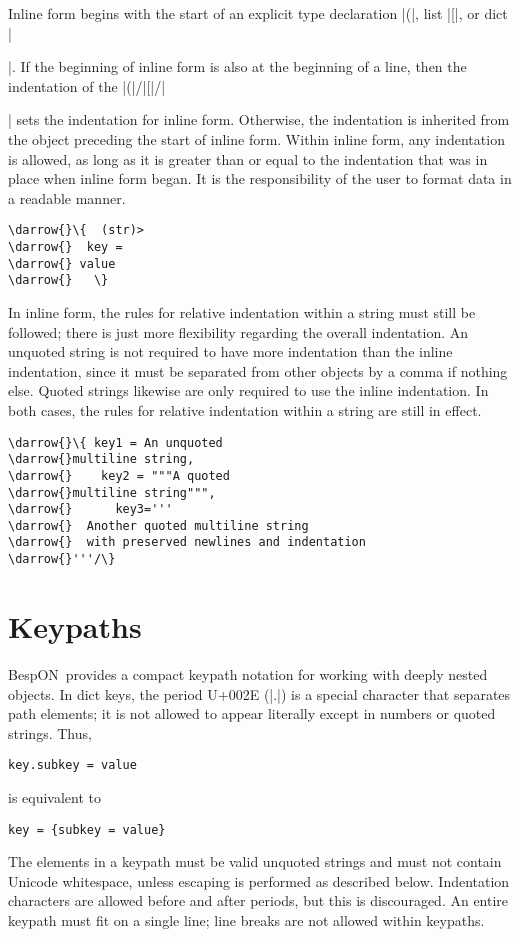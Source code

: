 \documentclass[11pt]{article}
\newcommand{\bespon}{BespON}
\newcommand{\darrow}{\ensuremath{\textcolor{DarkGreen}{\downarrow}}}
\begin{document}
Inline form begins with the start of an explicit type declaration |(|, list |[|, or dict |{|.  If the beginning of inline form is also at the beginning of a line, then the indentation of the |(|/|[|/|{| sets the indentation for inline form.  Otherwise, the indentation is inherited from the object preceding the start of inline form.  Within inline form, any indentation is allowed, as long as it is greater than or equal to the indentation that was in place when inline form began.  It is the responsibility of the user to format data in a readable manner.
\begin{Verbatim}[commandchars=\\\{\}]
\darrow{}\{  (str)>
\darrow{}  key = 
\darrow{} value
\darrow{}   \}
\end{Verbatim}

In inline form, the rules for relative indentation within a string must still be followed; there is just more flexibility regarding the overall indentation.  An unquoted string is not required to have more indentation than the inline indentation, since it must be separated from other objects by a comma if nothing else.  Quoted strings likewise are only required to use the inline indentation.  In both cases, the rules for relative indentation within a string are still in effect.
\begin{Verbatim}[commandchars=\\\{\}]
\darrow{}\{ key1 = An unquoted
\darrow{}multiline string,
\darrow{}    key2 = """A quoted
\darrow{}multiline string""",
\darrow{}      key3='''
\darrow{}  Another quoted multiline string
\darrow{}  with preserved newlines and indentation
\darrow{}'''/\}
\end{Verbatim}




\section{Keypaths}
\label{sec:keypath}

\bespon\ provides a compact keypath notation for working with deeply nested objects.  In dict keys, the period U+002E (|.|) is a special character that separates path elements; it is not allowed to appear literally except in numbers or quoted strings.  Thus,
\begin{Verbatim}
key.subkey = value
\end{Verbatim}
is equivalent to
\begin{Verbatim}
key = {subkey = value}
\end{Verbatim}
The elements in a keypath must be valid unquoted strings and must not contain Unicode whitespace, unless escaping is performed as described below.  Indentation characters are allowed before and after periods, but this is discouraged.  An entire keypath must fit on a single line; line breaks are not allowed within keypaths.

}}
\end{document}
